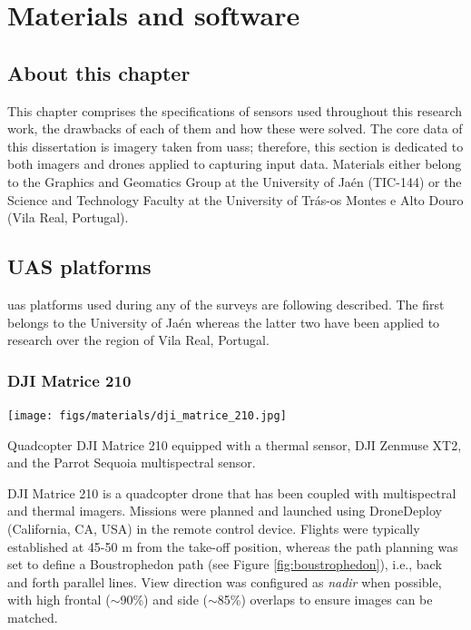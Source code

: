 \small\setchapterpreamble[u]{\margintoc}\normalsize
\chapter{Materials and software}
\label{sec:materials}

\section*{About this chapter}

This chapter comprises the specifications of sensors used throughout this research work, the drawbacks of each of them and how these were solved. The core data of this dissertation is imagery taken from \acrshort{uas}s; therefore, this section is dedicated to both imagers and drones applied to capturing input data. Materials either belong to the Graphics and Geomatics Group at the University of Jaén (TIC-144) or the Science and Technology Faculty at the University of Trás-os Montes e Alto Douro (Vila Real, Portugal). 

\section{UAS platforms}

\acrshort{uas} platforms used during any of the surveys are following described. The first belongs to the University of Jaén whereas the latter two have been applied to research over the region of Vila Real, Portugal.

\subsection{DJI Matrice 210}

\begin{marginfigure}[.1cm]
	\texttt{[image: figs/materials/dji\_matrice\_210.jpg]}
	\caption{Quadcopter DJI Matrice 210 equipped with a thermal sensor, DJI Zenmuse XT2, and the Parrot Sequoia multispectral sensor.}
    \label{fig:dji_matrice_210}
\end{marginfigure}
DJI Matrice 210 is a quadcopter drone that has been coupled with multispectral and thermal imagers. Missions were planned and launched using DroneDeploy (California, CA, USA) in the remote control device. Flights were typically established at 45-50 \si{\meter} from the take-off position, whereas the path planning was set to define a Boustrophedon path (see Figure \ref{fig:boustrophedon}), i.e., back and forth parallel lines. View direction was configured as \textit{nadir} when possible, with high frontal ($\sim$90\%) and side ($\sim$85\%) overlaps to ensure images can be matched.


